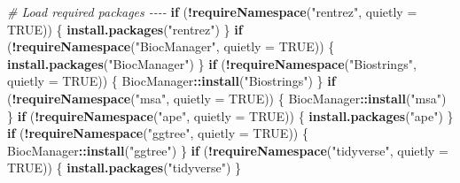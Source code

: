 \documentclass[
  11pt,
]{article}
\newenvironment{Shaded}{\begin{snugshade}}{\end{snugshade}}
\newcommand{\AttributeTok}[1]{\textcolor[rgb]{0.13,0.29,0.53}{#1}}
\newcommand{\CommentTok}[1]{\textcolor[rgb]{0.56,0.35,0.01}{\textit{#1}}}
\newcommand{\ConstantTok}[1]{\textcolor[rgb]{0.56,0.35,0.01}{#1}}
\newcommand{\ControlFlowTok}[1]{\textcolor[rgb]{0.13,0.29,0.53}{\textbf{#1}}}
\newcommand{\FunctionTok}[1]{\textcolor[rgb]{0.13,0.29,0.53}{\textbf{#1}}}
\newcommand{\NormalTok}[1]{#1}
\newcommand{\SpecialCharTok}[1]{\textcolor[rgb]{0.81,0.36,0.00}{\textbf{#1}}}
\newcommand{\StringTok}[1]{\textcolor[rgb]{0.31,0.60,0.02}{#1}}
\begin{document}
\begin{Shaded}
\begin{Highlighting}[]
\CommentTok{\# Load required packages {-}{-}{-}{-}}
\ControlFlowTok{if}\NormalTok{ (}\SpecialCharTok{!}\FunctionTok{requireNamespace}\NormalTok{(}\StringTok{"rentrez"}\NormalTok{, }\AttributeTok{quietly =} \ConstantTok{TRUE}\NormalTok{)) \{}
  \FunctionTok{install.packages}\NormalTok{(}\StringTok{"rentrez"}\NormalTok{)}
\NormalTok{\}}
\ControlFlowTok{if}\NormalTok{ (}\SpecialCharTok{!}\FunctionTok{requireNamespace}\NormalTok{(}\StringTok{"BiocManager"}\NormalTok{, }\AttributeTok{quietly =} \ConstantTok{TRUE}\NormalTok{)) \{}
  \FunctionTok{install.packages}\NormalTok{(}\StringTok{"BiocManager"}\NormalTok{)}
\NormalTok{\}}
\ControlFlowTok{if}\NormalTok{ (}\SpecialCharTok{!}\FunctionTok{requireNamespace}\NormalTok{(}\StringTok{"Biostrings"}\NormalTok{, }\AttributeTok{quietly =} \ConstantTok{TRUE}\NormalTok{)) \{}
\NormalTok{  BiocManager}\SpecialCharTok{::}\FunctionTok{install}\NormalTok{(}\StringTok{"Biostrings"}\NormalTok{)}
\NormalTok{\}}
\ControlFlowTok{if}\NormalTok{ (}\SpecialCharTok{!}\FunctionTok{requireNamespace}\NormalTok{(}\StringTok{"msa"}\NormalTok{, }\AttributeTok{quietly =} \ConstantTok{TRUE}\NormalTok{)) \{}
\NormalTok{  BiocManager}\SpecialCharTok{::}\FunctionTok{install}\NormalTok{(}\StringTok{"msa"}\NormalTok{)}
\NormalTok{\}}
\ControlFlowTok{if}\NormalTok{ (}\SpecialCharTok{!}\FunctionTok{requireNamespace}\NormalTok{(}\StringTok{"ape"}\NormalTok{, }\AttributeTok{quietly =} \ConstantTok{TRUE}\NormalTok{)) \{}
  \FunctionTok{install.packages}\NormalTok{(}\StringTok{"ape"}\NormalTok{)}
\NormalTok{\}}
\ControlFlowTok{if}\NormalTok{ (}\SpecialCharTok{!}\FunctionTok{requireNamespace}\NormalTok{(}\StringTok{"ggtree"}\NormalTok{, }\AttributeTok{quietly =} \ConstantTok{TRUE}\NormalTok{)) \{}
\NormalTok{  BiocManager}\SpecialCharTok{::}\FunctionTok{install}\NormalTok{(}\StringTok{"ggtree"}\NormalTok{)}
\NormalTok{\}}
\ControlFlowTok{if}\NormalTok{ (}\SpecialCharTok{!}\FunctionTok{requireNamespace}\NormalTok{(}\StringTok{"tidyverse"}\NormalTok{, }\AttributeTok{quietly =} \ConstantTok{TRUE}\NormalTok{)) \{}
  \FunctionTok{install.packages}\NormalTok{(}\StringTok{"tidyverse"}\NormalTok{)}
\NormalTok{\}}
\end{Highlighting}
\end{Shaded}
\end{document}
